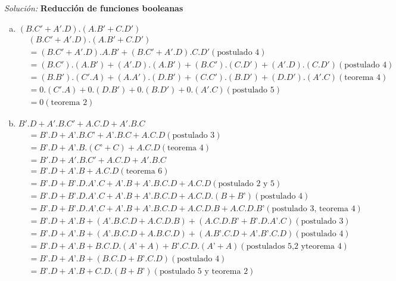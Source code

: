 \documentclass{article}
\newenvironment{solution}
    {\textit{Solución:}}
    {}
\begin{document}
\begin{solution}
\textbf{Reducción de funciones booleanas}\\
\begin{enumerate}[a)]
    \item $(B.C' + A'.D).(A.B' + C.D')$\\
    \begin{align*}
        & (B.C' + A'.D).(A.B' + C.D') \\
        &= (B.C' + A'.D).A.B' + (B.C' + A'.D).C.D' (\text{postulado 4})\\
        &= (B.C').(A.B') + (A'.D).(A.B') + (B.C').(C.D') + (A'.D).(C.D') (\text{postulado 4})\\
        &= (B.B').(C'.A) + (A.A').(D.B') + (C.C').(B.D') + (D.D').(A'.C) (\text{teorema 4})\\
        &= 0.(C'.A) + 0.(D.B') + 0.(B.D') + 0.(A'.C) (\text{postulado 5})\\
        &= 0 (\text{teorema 2})
    \end{align*}
    \item $B'.D + A'.B.C' + A.C.D + A'.B.C$\\
    \begin{align*}
        &= B’.D + A’.B.C’ + A’.B.C + A.C.D (\text{postulado 3})\\
        &= B’.D + A’.B.(C’+C) + A.C.D (\text{teorema 4})\\
        &= B'.D + A'.B.C' + A.C.D + A'.B.C \\
        &= B’.D + A’.B + A.C.D (\text{teorema 6})\\
        &= B’.D + B’.D.A’.C + A’.B + A’.B.C.D + A.C.D (\text{postulado 2 y 5})\\
        &= B’.D + B’.D.A’.C + A’.B + A’.B.C.D + A.C.D.(B + B’) (\text{postulado 4})\\
        &= B’.D + B’.D.A’.C + A’.B + A’.B.C.D + A.C.D.B + A.C.D.B’ (\text{postulado 3, teorema 4})\\
        &= B’.D + A’.B + (A’.B.C.D + A.C.D.B) + (A.C.D.B’ + B’.D.A’.C) (\text{postulado 3})\\
        &= B’.D + A’.B + (A’.B.C.D + A.B.C.D) + (A.B’.C.D + A’.B’.C.D) (\text{postulado 4})\\
        &= B’.D + A’.B + B.C.D.(A’ + A) + B’.C.D.(A’ + A) (\text{postulados 5,2 yteorema 4})\\
        &= B’.D + A’.B + (B.C.D + B’.C.D) (\text{postulado 4})\\
        &= B’.D + A’.B + C.D.(B + B’) (\text{postulado 5 y teorema 2})\\

\end{align*}
\end{enumerate}
\end{solution}
\end{document}
